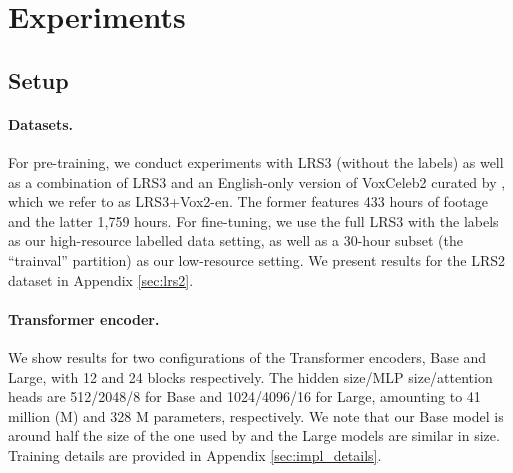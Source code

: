 \documentclass{article} \usepackage{iclr2023_conference,times}
\begin{document}
\section{Experiments}
\subsection{Setup}
\paragraph{Datasets.} For pre-training, we conduct experiments with LRS3 \citep{afouras2018lrs3} (without the labels) as well as a combination of LRS3 and an English-only version of VoxCeleb2 \citep{DBLP:conf/interspeech/ChungNZ18} curated by \citet{shi2022learning}, which we refer to as LRS3+Vox2-en. The former features 433 hours of footage and the latter 1,759 hours. For fine-tuning, we use the full LRS3 with the labels as our high-resource labelled data setting, as well as a 30-hour subset (the ``trainval'' partition) as our low-resource setting. We present results for the LRS2 dataset \citep{chung2017lip} in Appendix \ref{sec:lrs2}.

\paragraph{Transformer encoder.} We show results for two configurations of the Transformer encoders, Base and Large, with 12 and 24 blocks respectively. The hidden size/MLP size/attention heads are 512/2048/8 for Base and 1024/4096/16 for Large, amounting to 41 million (M) and 328 M parameters, respectively. We note that our Base model is around half the size of the one used by \citet{shi2022learning} and the Large models are similar in size. Training details are provided in Appendix \ref{sec:impl_details}.
\end{document}
